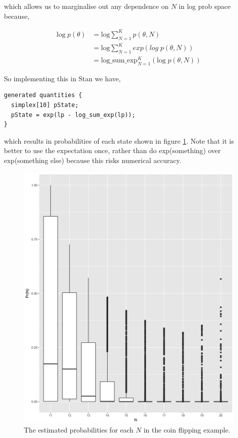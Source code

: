 \documentclass{article}
\begin{document}
which allows us to marginalise out any dependence on $N$ in log prob space because,

\begin{align}
\text{log} \; p(\theta) &= \text{log} \sum_{N=1}^{K} p(\theta,N)\\
&= \text{log} \sum_{N=1}^{K} exp\left( log\; p(\theta,N)\right)\\
&= \text{log}\_\text{sum}\_\text{exp}_{N=1}^{K}(\text{log}\; p(\theta,N))
\end{align}

So implementing this in Stan we have,

\begin{verbatim}
generated quantities { 
  simplex[10] pState;
  pState = exp(lp - log_sum_exp(lp)); 
} 
\end{verbatim}

which results in probabilities of each state shown in figure \ref{fig:coinFlip_boxPlot}. Note that it is better to use the expectation once, rather than do exp(something) over exp(something else) because this risks numerical accuracy.

\begin{figure}[ht]
	\centerline{\includegraphics[width=1\textwidth]{figures/coinFlip_boxplot.png}}
	\caption{The estimated probabilities for each $N$ in the coin flipping example.}\label{fig:coinFlip_boxPlot}
\end{figure} 


 

\end{document}
